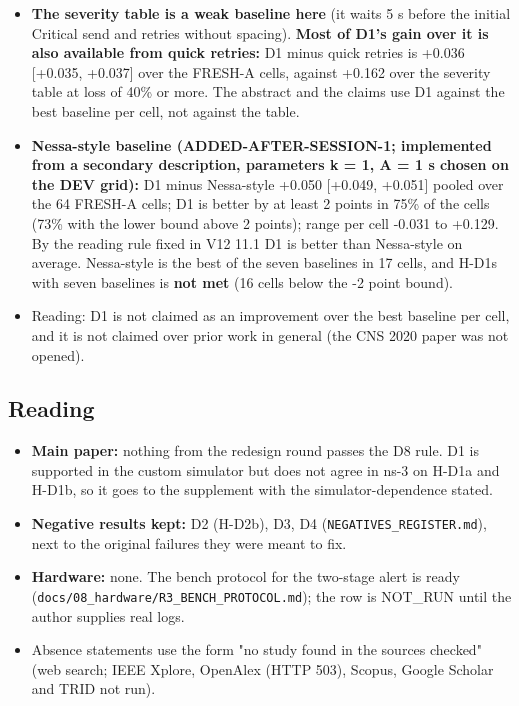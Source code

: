 \begin{itemize}
\item \textbf{The severity table is a weak baseline here} (it waits 5 s before the initial Critical send and retries without spacing). \textbf{Most of D1's gain over it is also available from quick retries:} D1 minus quick retries is +0.036 [+0.035, +0.037] over the FRESH-A cells, against +0.162 over the severity table at loss of 40\% or more. The abstract and the claims use D1 against the best baseline per cell, not against the table.
\item \textbf{Nessa-style baseline (ADDED-AFTER-SESSION-1; implemented from a secondary description, parameters k = 1, A = 1 s chosen on the DEV grid):} D1 minus Nessa-style +0.050 [+0.049, +0.051] pooled over the 64 FRESH-A cells; D1 is better by at least 2 points in 75\% of the cells (73\% with the lower bound above 2 points); range per cell -0.031 to +0.129. By the reading rule fixed in V12 11.1 D1 is better than Nessa-style on average. Nessa-style is the best of the seven baselines in 17 cells, and H-D1s with seven baselines is \textbf{not met} (16 cells below the -2 point bound).
\item Reading: D1 is not claimed as an improvement over the best baseline per cell, and it is not claimed over prior work in general (the CNS 2020 paper was not opened).
\end{itemize}

\subsection*{Reading}

\begin{itemize}
\item \textbf{Main paper:} nothing from the redesign round passes the D8 rule. D1 is supported in the custom simulator but does not agree in ns-3 on H-D1a and H-D1b, so it goes to the supplement with the simulator-dependence stated.
\item \textbf{Negative results kept:} D2 (H-D2b), D3, D4 (\texttt{NEGATIVES\_REGISTER.md}), next to the original failures they were meant to fix.
\item \textbf{Hardware:} none. The bench protocol for the two-stage alert is ready (\texttt{docs/08\_hardware/R3\_BENCH\_PROTOCOL.md}); the row is NOT\_RUN until the author supplies real logs.
\item Absence statements use the form "no study found in the sources checked" (web search; IEEE Xplore, OpenAlex (HTTP 503), Scopus, Google Scholar and TRID not run).
\end{itemize}

